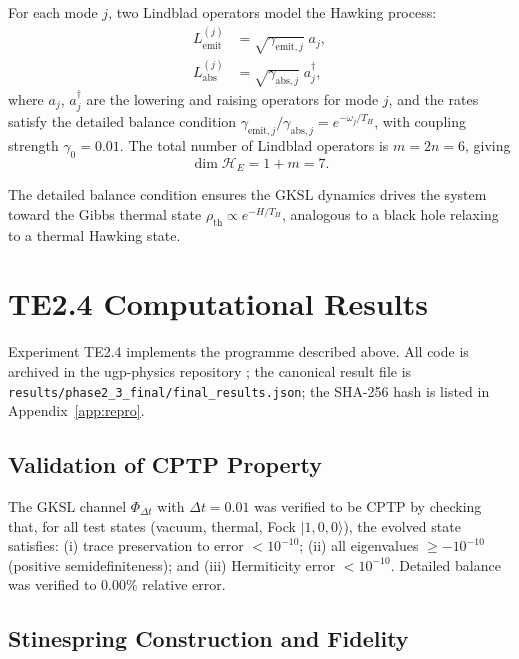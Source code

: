 \documentclass[11pt,twocolumn]{article}
\theoremstyle{remark}
\begin{document}
For each mode $j$, two Lindblad operators model the Hawking process:
\begin{align}
  L^{(j)}_{\mathrm{emit}} &= \sqrt{\gamma_{\mathrm{emit},j}}\; a_j,
  \label{eq:lemit}\\
  L^{(j)}_{\mathrm{abs}} &= \sqrt{\gamma_{\mathrm{abs},j}}\; a_j^\dagger,
  \label{eq:labs}
\end{align}
where $a_j$, $a_j^\dagger$ are the lowering and raising operators for
mode $j$, and the rates satisfy the detailed balance condition
$\gamma_{\mathrm{emit},j}/\gamma_{\mathrm{abs},j} = e^{-\omega_j/T_H}$,
with coupling strength $\gamma_0 = 0.01$. The total number of Lindblad
operators is $m = 2n = 6$, giving
\begin{equation}
  \dim\mathcal{H}_E = 1 + m = 7.
  \label{eq:dimE}
\end{equation}

The detailed balance condition ensures the GKSL dynamics drives the
system toward the Gibbs thermal state $\rho_{\mathrm{th}} \propto
e^{-H/T_H}$, analogous to a black hole relaxing to a thermal
Hawking state.

\section{TE2.4 Computational Results}
\label{sec:te24}

Experiment TE2.4 \cite{SpivackBHUnitarity} implements the programme described
above. All code is archived in the ugp-physics repository
\cite{ugp-physics-repo}; the canonical result file is
\texttt{results/phase2\_3\_final/final\_results.json};
the SHA-256 hash is listed in Appendix~\ref{app:repro}.

\subsection{Validation of CPTP Property}

The GKSL channel $\Phi_{\Delta t}$ with $\Delta t = 0.01$ was verified
to be CPTP by checking that, for all test states (vacuum, thermal, Fock
$|1,0,0\rangle$), the evolved state satisfies: (i) trace preservation
to error $< 10^{-10}$; (ii) all eigenvalues $\geq -10^{-10}$ (positive
semidefiniteness); and (iii) Hermiticity error $< 10^{-10}$. Detailed
balance was verified to $0.00\%$ relative error.

\subsection{Stinespring Construction and Fidelity}
\end{document}
